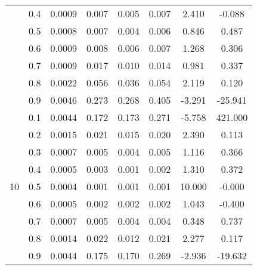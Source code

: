 \documentclass[11pt,a4paper]{report}
\begin{document}
\begin{longtable}{ | c | c || c | c | c | c | c | c | }
 & 0.4 & 0.0009 & 0.007 & 0.005 & 0.007 & 2.410 & -0.088 \\
 & 0.5 & 0.0008 & 0.007 & 0.004 & 0.006 & 0.846 & 0.487 \\
 & 0.6 & 0.0009 & 0.008 & 0.006 & 0.007 & 1.268 & 0.306 \\
 & 0.7 & 0.0009 & 0.017 & 0.010 & 0.014 & 0.981 & 0.337 \\
 & 0.8 & 0.0022 & 0.056 & 0.036 & 0.054 & 2.119 & 0.120 \\
 & 0.9 & 0.0046 & 0.273 & 0.268 & 0.405 & -3.291 & -25.941 \\
 \hline
\multirow{9}{*}{10} & 0.1 & 0.0044 & 0.172 & 0.173 & 0.271 & -5.758 & 421.000 \\
 & 0.2 & 0.0015 & 0.021 & 0.015 & 0.020 & 2.390 & 0.113 \\
 & 0.3 & 0.0007 & 0.005 & 0.004 & 0.005 & 1.116 & 0.366 \\
 & 0.4 & 0.0005 & 0.003 & 0.001 & 0.002 & 1.310 & 0.372 \\
 & 0.5 & 0.0004 & 0.001 & 0.001 & 0.001 & 10.000 & -0.000 \\
 & 0.6 & 0.0005 & 0.002 & 0.002 & 0.002 & 1.043 & -0.400 \\
 & 0.7 & 0.0007 & 0.005 & 0.004 & 0.004 & 0.348 & 0.737 \\
 & 0.8 & 0.0014 & 0.022 & 0.012 & 0.021 & 2.277 & 0.117 \\
 & 0.9 & 0.0044 & 0.175 & 0.170 & 0.269 & -2.936 & -19.632 \\
 \hline
\hline
\end{longtable}
\end{document}
